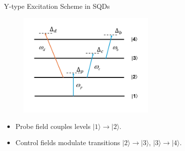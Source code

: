 \documentclass[12pt,aspectratio=1610]{beamer}
\begin{document}
\begin{frame}{Y-type Excitation Scheme in SQDs}
  \vspace{-30pt}
  \begin{figure}
    \includegraphics[width=0.6\textwidth]{Assets/Y-type.png}
  \end{figure}
  \vspace{-12pt}
  \begin{itemize}
    \item Probe field couples levels $|1\rangle \rightarrow |2\rangle$.
    \item Control fields modulate transitions $|2\rangle \rightarrow |3\rangle$, $|3\rangle \rightarrow |4\rangle$.
  \end{itemize}
\end{frame}
\end{document}
